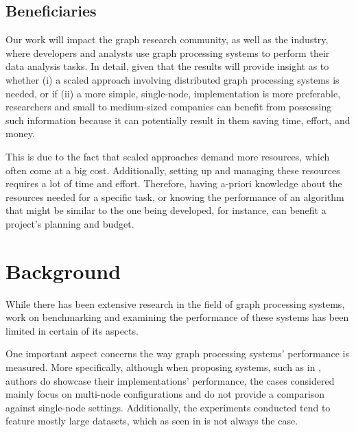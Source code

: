 \documentclass[a4paper,11pt]{article}
\begin{document}

\subsection{Beneficiaries}

\par Our work will impact the graph research community, as well as the industry, where developers and analysts use graph processing systems to perform their data analysis tasks. In detail, given that the results will provide insight as to whether (i) a scaled approach involving distributed graph processing systems is needed, or if (ii) a more simple, single-node, implementation is more preferable, researchers and small to medium-sized companies can benefit from possessing such information because it can potentially result in them saving time, effort, and money.

\par This is due to the fact that scaled approaches demand more resources, which often come at a big cost. Additionally, setting up and managing these resources requires a lot of time and effort. Therefore, having a-priori knowledge about the resources needed for a specific task, or knowing the performance of an algorithm that might be similar to the one being developed, for instance, can benefit a project's planning and budget.





\section{Background} \label{background}

\par While there has been extensive research in the field of graph processing systems, work on benchmarking and examining the performance of these systems has been limited in certain of its aspects. 

\par One important aspect concerns the way graph processing systems' performance is measured. More specifically, although when proposing systems, such as in \cite{pregel,graphxpaper, powergraph}, authors do showcase their implementations' performance, the cases considered mainly focus on multi-node configurations and do not provide a comparison against single-node settings. Additionally, the experiments conducted tend to feature mostly large datasets, which as seen in \cite{survey} is not always the case.
\end{document}
